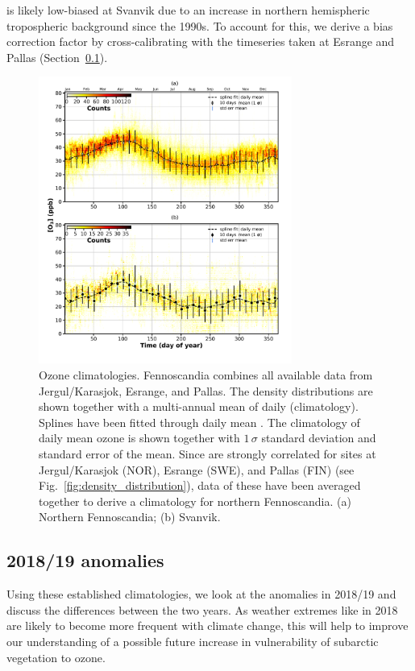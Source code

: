 \documentclass[bg, manuscript]{copernicus}
\begin{document}
\chem{\left<[O_3]\right>} is likely low-biased at Svanvik due to an increase in northern hemispheric tropospheric background \chem{[O_3]} since the 1990s. To account for this, we derive a bias correction factor by cross-calibrating with the timeseries taken at Esrange and Pallas (Section~\ref{subsec:anomalies}).

\begin{figure}[t]
  \includegraphics[width=8.3cm]{fig06}
  \caption{Ozone climatologies. Fennoscandia combines all available data from Jergul/Karasjok, Esrange, and Pallas. The density distributions are shown together with a multi-annual mean of daily \chem{[O_3]} (climatology). Splines have been fitted through daily mean \chem{[O_3]}. The climatology of daily mean ozone is shown together with $1\,\sigma$ standard deviation and standard error of the mean. Since \chem{[O_3]} are strongly correlated for sites at Jergul/Karasjok (NOR), Esrange (SWE), and Pallas (FIN) (see Fig.~\ref{fig:density_distribution}), data of these have been averaged together to derive a climatology for northern Fennoscandia. (a) Northern Fennoscandia; (b) Svanvik.}
  \label{fig:ozone_climatology_fenoscandic_obs_spline}
\end{figure}

\subsection{2018/19 anomalies}
\label{subsec:anomalies}
Using these established climatologies, we look at the anomalies in 2018/19 and discuss the differences between the two years. As weather extremes like in 2018 are likely to become more frequent with climate change, this will help to improve our understanding of a possible future increase in vulnerability of subarctic vegetation to ozone. 
\end{document}
